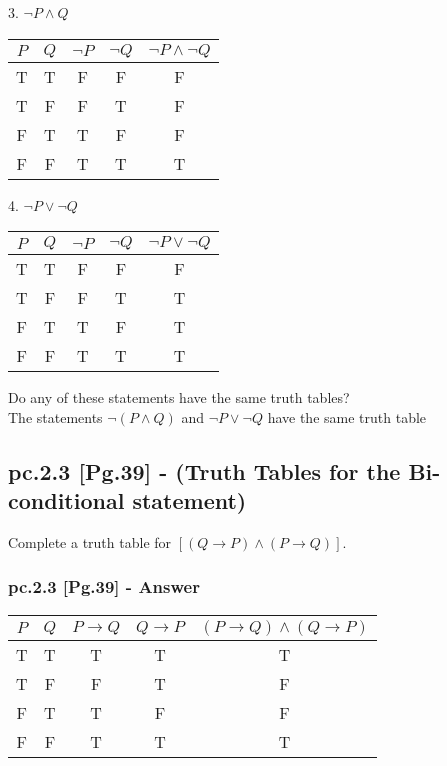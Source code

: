 3. $\neg P \wedge Q$ \\

\begin{center}
\begin{tabular}{|c|c|c|c|c|}
\hline 
$P$ & $Q$ & $\neg P$ & $\neg Q$ & $\neg P \wedge \neg Q$\\ 
\hline 
T & T & F & F & F \\ 
\hline 
T & F & F & T & F \\ 
\hline 
F & T & T & F & F \\ 
\hline 
F & F & T & T & T \\ 
\hline 
\end{tabular} 
\end{center}

4. $\neg P \vee \neg Q$ \\

\begin{center}
\begin{tabular}{|c|c|c|c|c|}
\hline 
$P$ & $Q$ & $\neg P$ & $\neg Q$ & $\neg P \vee \neg Q$\\ 
\hline 
T & T & F & F & F \\ 
\hline 
T & F & F & T & T \\ 
\hline 
F & T & T & F & T \\ 
\hline 
F & F & T & T & T \\ 
\hline 
\end{tabular} 
\end{center}


Do any of these statements have the same truth tables? \\ 
The statements $\neg (P \wedge Q)$ and $\neg P \vee \neg Q$ have the same truth table


\subsection{pc.2.3 [Pg.39] - (Truth Tables for the Bi-conditional statement)}

Complete a truth table for $[(Q \to P) \wedge (P \to Q)]$.

\subsubsection*{pc.2.3 [Pg.39] - Answer}

\begin{center}
\begin{tabular}{|c|c|c|c|c|}
\hline 
$P$ & $Q$ & $P \to Q$ & $Q \to P$ & $(P \to Q) \wedge (Q \to P)$ \\ 
\hline 
T & T & T & T & T \\ 
\hline 
T & F & F & T & F \\ 
\hline 
F & T & T & F & F \\ 
\hline 
F & F & T & T & T \\ 
\hline 
\end{tabular} 
\end{center}



